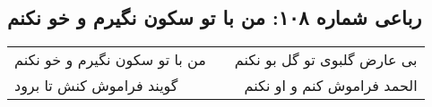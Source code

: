 \begin{center}
\section*{رباعی شماره ۱۰۸: من با تو سکون نگیرم و خو نکنم}
\label{sec:108}
\begin{longtable}{l p{0.5cm} r}
من با تو سکون نگیرم و خو نکنم
&&
بی عارض گلبوی تو گل بو نکنم
\\
گویند فراموش کنش تا برود
&&
الحمد فراموش کنم و او نکنم
\\
\end{longtable}
\end{center}
